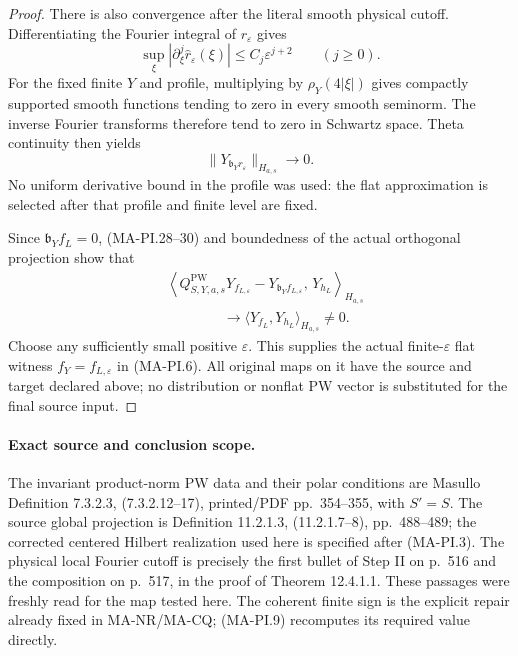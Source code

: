 \begin{proof}
There is also convergence after the literal smooth
physical cutoff.  Differentiating the Fourier integral
of $r_\varepsilon$ gives
\[
 \sup_\xi|\partial_\xi^j\widehat r_\varepsilon(\xi)|
      \leq C_j\varepsilon^{j+2}
                         \qquad(j\geq0).
 \tag{MA-PI.29}
\]
For the fixed finite $Y$ and profile, multiplying by
$\rho_Y(4|\xi|)$ gives compactly supported smooth
functions tending to zero in every smooth seminorm.
The inverse Fourier transforms therefore tend to zero
in Schwartz space.  Theta continuity then yields
\[
 \|Y_{\mathfrak b_Yr_\varepsilon}\|_{H_{a,s}}
                   \longrightarrow0.
 \tag{MA-PI.30}
\]
No uniform derivative bound in the profile was used:
the flat approximation is selected after that profile
and finite level are fixed.

Since $\mathfrak b_Yf_L=0$, (MA-PI.28--30) and boundedness
of the actual orthogonal projection show that
\[
 \begin{split}
 &\left\langle
 Q^{\mathrm{PW}}_{S,Y,a,s}Y_{f_{L,\varepsilon}}
       -Y_{\mathfrak b_Yf_{L,\varepsilon}},\,Y_{h_L}
                  \right\rangle_{H_{a,s}}\\
 &\hspace{4em}\longrightarrow
                  \langle Y_{f_L},Y_{h_L}\rangle_{H_{a,s}}
                         \ne0.
 \end{split}
 \tag{MA-PI.31}
\]
Choose any sufficiently small positive $\varepsilon$.
This supplies the actual finite-$\varepsilon$ flat
witness $f_Y=f_{L,\varepsilon}$ in (MA-PI.6).
All original maps on it have the source and target
declared above; no distribution or nonflat PW vector
is substituted for the final source input.
\end{proof}

\paragraph{Exact source and conclusion scope.}
The invariant product-norm PW data and their polar
conditions are Masullo Definition 7.3.2.3,
(7.3.2.12--17), printed/PDF pp.~354--355, with $S'=S$.
The source global projection is Definition 11.2.1.3,
(11.2.1.7--8), pp.~488--489; the corrected centered
Hilbert realization used here is specified after
(MA-PI.3).  The physical local Fourier
cutoff is precisely the first bullet of Step II on
p.~516 and the composition on p.~517, in the proof of
Theorem 12.4.1.1.  These passages were freshly read for
the map tested here.  The coherent finite sign is the
explicit repair already fixed in MA-NR/MA-CQ; (MA-PI.9)
recomputes its required value directly.

